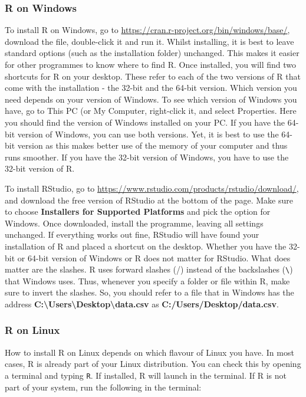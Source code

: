 \documentclass[
]{article}
\begin{document}
\hypertarget{r-on-windows}{%
\subsubsection{R on Windows}\label{r-on-windows}}

To install R on Windows, go to \url{https://cran.r-project.org/bin/windows/base/}, download the file, double-click it and run it. Whilst installing, it is best to leave standard options (such as the installation folder) unchanged. This makes it easier for other programmes to know where to find R. Once installed, you will find two shortcuts for R on your desktop. These refer to each of the two versions of R that come with the installation - the 32-bit and the 64-bit version. Which version you need depends on your version of Windows. To see which version of Windows you have, go to This PC (or My Computer, right-click it, and select Properties. Here you should find the version of Windows installed on your PC. If you have the 64-bit version of Windows, you can use both versions. Yet, it is best to use the 64-bit version as this makes better use of the memory of your computer and thus runs smoother. If you have the 32-bit version of Windows, you have to use the 32-bit version of R.

To install RStudio, go to \url{https://www.rstudio.com/products/rstudio/download/}, and download the free version of RStudio at the bottom of the page. Make sure to choose \textbf{Installers for Supported Platforms} and pick the option for Windows. Once downloaded, install the programme, leaving all settings unchanged. If everything works out fine, RStudio will have found your installation of R and placed a shortcut on the desktop. Whether you have the 32-bit or 64-bit version of Windows or R does not matter for RStudio. What does matter are the slashes. R uses forward slashes (/) instead of the backslashes (\texttt{\textbackslash{}}) that Windows uses. Thus, whenever you specify a folder or file within R, make sure to invert the slashes. So, you should refer to a file that in Windows has the address \textbf{C:\textbackslash Users\textbackslash Desktop\textbackslash data.csv} as \textbf{C:/Users/Desktop/data.csv}.

\hypertarget{r-on-linux}{%
\subsubsection{R on Linux}\label{r-on-linux}}

How to install R on Linux depends on which flavour of Linux you have. In most cases, R is already part of your Linux distribution. You can check this by opening a terminal and typing \texttt{R}. If installed, R will launch in the terminal. If R is not part of your system, run the following in the terminal:
\end{document}
